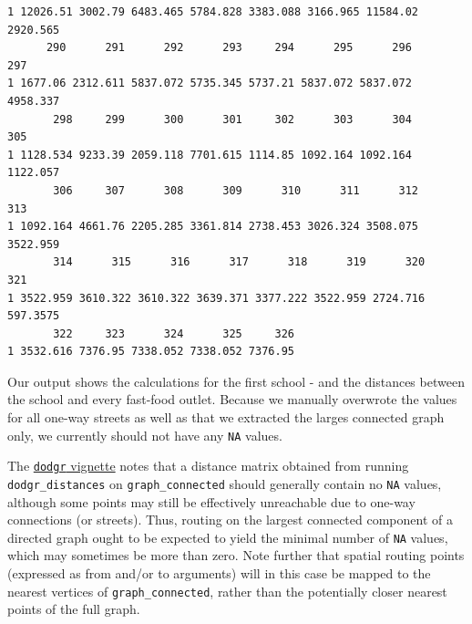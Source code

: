 \documentclass[
  letterpaper,
  DIV=11,
  numbers=noendperiod]{scrreprt}
\begin{document}
\begin{verbatim}
1 12026.51 3002.79 6483.465 5784.828 3383.088 3166.965 11584.02 2920.565
      290      291      292      293     294      295      296      297
1 1677.06 2312.611 5837.072 5735.345 5737.21 5837.072 5837.072 4958.337
       298     299      300      301     302      303      304      305
1 1128.534 9233.39 2059.118 7701.615 1114.85 1092.164 1092.164 1122.057
       306     307      308      309      310      311      312      313
1 1092.164 4661.76 2205.285 3361.814 2738.453 3026.324 3508.075 3522.959
       314      315      316      317      318      319      320      321
1 3522.959 3610.322 3610.322 3639.371 3377.222 3522.959 2724.716 597.3575
       322     323      324      325     326
1 3532.616 7376.95 7338.052 7338.052 7376.95
\end{verbatim}

Our output shows the calculations for the first school - and the
distances between the school and every fast-food outlet. Because we
manually overwrote the values for all one-way streets as well as that we
extracted the larges connected graph only, we currently should not have
any \texttt{NA} values.

\begin{tcolorbox}[enhanced jigsaw, rightrule=.15mm, colback=white, opacityback=0, opacitybacktitle=0.6, coltitle=black, colbacktitle=quarto-callout-tip-color!10!white, breakable, arc=.35mm, title=\textcolor{quarto-callout-tip-color}{\faLightbulb}\hspace{0.5em}{Tip}, left=2mm, leftrule=.75mm, bottomtitle=1mm, toprule=.15mm, bottomrule=.15mm, colframe=quarto-callout-tip-color-frame, toptitle=1mm, titlerule=0mm]

The
\href{https://cran.r-project.org/web/packages/dodgr/vignettes/dodgr.html\#4_Distance_Matrices:_dodgr_dists()}{\texttt{dodgr}
vignette} notes that a distance matrix obtained from running
\texttt{dodgr\_distances} on \texttt{graph\_connected} should generally
contain no \texttt{NA} values, although some points may still be
effectively unreachable due to one-way connections (or streets). Thus,
routing on the largest connected component of a directed graph ought to
be expected to yield the minimal number of \texttt{NA} values, which may
sometimes be more than zero. Note further that spatial routing points
(expressed as from and/or to arguments) will in this case be mapped to
the nearest vertices of \texttt{graph\_connected}, rather than the
potentially closer nearest points of the full graph.

\end{tcolorbox}
\end{document}
